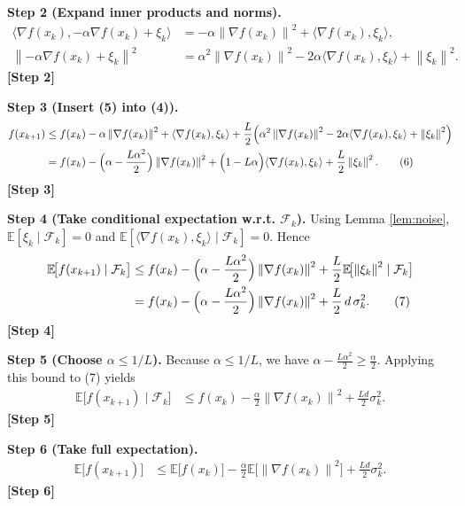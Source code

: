 \documentclass{article}
\newcommand{\E}{\mathbb{E}}
\newcommand{\norm}[1]{\left\lVert#1\right\rVert}
\newcommand{\ip}[2]{\langle #1,#2\rangle}
\begin{document}
\bigskip
\noindent\textbf{Step 2 (Expand inner products and norms).}
\begin{align}
\ip{\nabla f(x_{k})}{-\alpha\nabla f(x_{k})+\xi_{k}}
&= -\alpha\norm{\nabla f(x_{k})}^{2}+\ip{\nabla f(x_{k})}{\xi_{k}},\nonumber\\
\norm{-\alpha\nabla f(x_{k})+\xi_{k}}^{2}
&= \alpha^{2}\norm{\nabla f(x_{k})}^{2}-2\alpha\ip{\nabla f(x_{k})}{\xi_{k}}+\norm{\xi_{k}}^{2}.
\tag{5}
\end{align}
\noindent\textbf{[Step 2]}

\bigskip
\noindent\textbf{Step 3 (Insert (5) into (4)).}
\begin{align}
f(x_{k+1})
&\le f(x_{k})-\alpha\norm{\nabla f(x_{k})}^{2}
+\ip{\nabla f(x_{k})}{\xi_{k}}
+\frac{L}{2}\Bigl(\alpha^{2}\norm{\nabla f(x_{k})}^{2}
-2\alpha\ip{\nabla f(x_{k})}{\xi_{k}}
+\norm{\xi_{k}}^{2}\Bigr)\nonumber\\
&= f(x_{k})
-\Bigl(\alpha-\frac{L\alpha^{2}}{2}\Bigr)\norm{\nabla f(x_{k})}^{2}
+\Bigl(1-L\alpha\Bigr)\ip{\nabla f(x_{k})}{\xi_{k}}
+\frac{L}{2}\norm{\xi_{k}}^{2}.
\tag{6}
\end{align}
\noindent\textbf{[Step 3]}

\bigskip
\noindent\textbf{Step 4 (Take conditional expectation w.r.t. $\mathcal{F}_{k}$).}  
Using Lemma \ref{lem:noise}, $\E[\xi_{k}\mid\mathcal{F}_{k}]=0$ and $\E[\ip{\nabla f(x_{k})}{\xi_{k}}\mid\mathcal{F}_{k}]=0$. Hence
\begin{align}
\E\!\bigl[f(x_{k+1})\mid\mathcal{F}_{k}\bigr]
&\le f(x_{k})
-\Bigl(\alpha-\frac{L\alpha^{2}}{2}\Bigr)\norm{\nabla f(x_{k})}^{2}
+\frac{L}{2}\E\!\bigl[\norm{\xi_{k}}^{2}\mid\mathcal{F}_{k}\bigr]\nonumber\\
&= f(x_{k})
-\Bigl(\alpha-\frac{L\alpha^{2}}{2}\Bigr)\norm{\nabla f(x_{k})}^{2}
+\frac{L}{2}\,d\,\sigma_{k}^{2}.
\tag{7}
\end{align}
\noindent\textbf{[Step 4]}

\bigskip
\noindent\textbf{Step 5 (Choose $\alpha\le 1/L$).}  
Because $\alpha\le 1/L$, we have $\alpha-\frac{L\alpha^{2}}{2}\ge \frac{\alpha}{2}$. Applying this bound to (7) yields
\begin{align}
\E\!\bigl[f(x_{k+1})\mid\mathcal{F}_{k}\bigr]
&\le f(x_{k})
-\frac{\alpha}{2}\norm{\nabla f(x_{k})}^{2}
+\frac{L d}{2}\sigma_{k}^{2}.
\tag{8}
\end{align}
\noindent\textbf{[Step 5]}

\bigskip
\noindent\textbf{Step 6 (Take full expectation).}
\begin{align}
\E\!\bigl[f(x_{k+1})\bigr]
&\le \E\!\bigl[f(x_{k})\bigr]
-\frac{\alpha}{2}\E\!\bigl[\norm{\nabla f(x_{k})}^{2}\bigr]
+\frac{L d}{2}\sigma_{k}^{2}.
\tag{9}
\end{align}
\noindent\textbf{[Step 6]}
\end{document}
